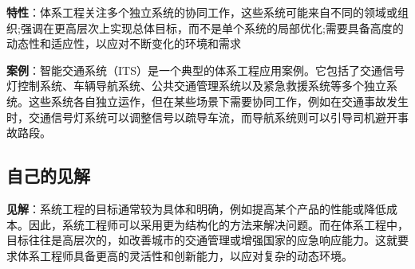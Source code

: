 \documentclass[UTF8,a4paper]{ctexart}
\begin{document}
	\textbf{特性}：体系工程关注多个独立系统的协同工作，这些系统可能来自不同的领域或组织;强调在更高层次上实现总体目标，而不是单个系统的局部优化;需要具备高度的动态性和适应性，以应对不断变化的环境和需求
	
    \textbf{案例}：智能交通系统（ITS）是一个典型的体系工程应用案例。它包括了交通信号灯控制系统、车辆导航系统、公共交通管理系统以及紧急救援系统等多个独立系统。这些系统各自独立运作，但在某些场景下需要协同工作，例如在交通事故发生时，交通信号灯系统可以调整信号以疏导车流，而导航系统则可以引导司机避开事故路段。

	\subsection{自己的见解}
	\textbf{见解}：系统工程的目标通常较为具体和明确，例如提高某个产品的性能或降低成本。因此，系统工程师可以采用更为结构化的方法来解决问题。而在体系工程中，目标往往是高层次的，如改善城市的交通管理或增强国家的应急响应能力。这就要求体系工程师具备更高的灵活性和创新能力，以应对复杂的动态环境。

    \newpage
\end{document}
